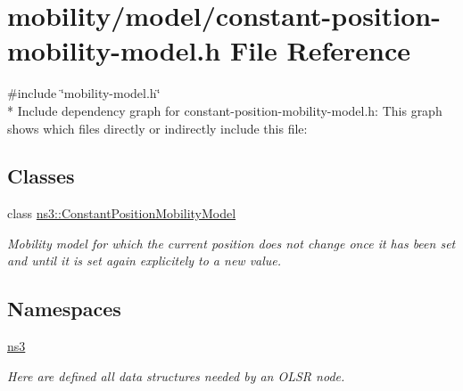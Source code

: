 \hypertarget{constant-position-mobility-model_8h}{}\section{mobility/model/constant-\/position-\/mobility-\/model.h File Reference}
\label{constant-position-mobility-model_8h}
{\ttfamily \#include \char`\"{}mobility-\/model.\+h\char`\"{}}\\*
Include dependency graph for constant-\/position-\/mobility-\/model.h\+:
This graph shows which files directly or indirectly include this file\+:
\subsection*{Classes}
\begin{DoxyCompactItemize}
\item 
class \hyperlink{classns3_1_1ConstantPositionMobilityModel}{ns3\+::\+Constant\+Position\+Mobility\+Model}
\begin{DoxyCompactList}\small\item\em Mobility model for which the current position does not change once it has been set and until it is set again explicitely to a new value. \end{DoxyCompactList}\end{DoxyCompactItemize}
\subsection*{Namespaces}
\begin{DoxyCompactItemize}
\item 
 \hyperlink{namespacens3}{ns3}
\begin{DoxyCompactList}\small\item\em Here are defined all data structures needed by an O\+L\+SR node. \end{DoxyCompactList}\end{DoxyCompactItemize}

